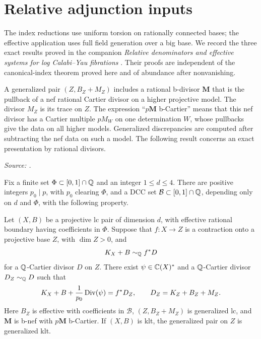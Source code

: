 \section{Relative adjunction inputs}\label{sec:relative-inputs}

The index reductions use uniform torsion on rationally connected bases;
the effective application uses full field generation over a big base.
We record the three exact results proved in the companion
\emph{Relative denominators and effective systems for log Calabi--Yau
fibrations} \cite{OpenAIRelative}. Their proofs are independent of the
canonical-index theorem proved here and of abundance after nonvanishing.

A generalized pair $(Z,B_Z+M_Z)$ includes a rational b-divisor
$\mathbf M$ that is the pullback of a nef rational Cartier divisor
on a higher projective model. The divisor $M_Z$ is its trace on $Z$.
The expression ``$p\mathbf M$ b-Cartier'' means that this nef divisor
has a Cartier multiple $pM_W$ on one determination $W$, whose
pullbacks give the data on all higher models. Generalized discrepancies
are computed after subtracting the nef data on such a model. The
following result concerns an exact presentation by rational divisors.

\noindent\textit{Source: \cite[Theorem~\RDenominatorNumber]{OpenAIRelative}.}
\begin{theorem}
\label{thm:relative-denominators}
Fix a finite set $\Phi\subset[0,1]\cap\mathbb Q$ and an integer $1\leq d\leq4$.
There are positive integers $p_0\mid p$, with $p_0$ clearing $\Phi$, and a
DCC set $\mathcal B\subset[0,1]\cap\mathbb Q$, depending only on $d$ and $\Phi$,
with the following property.

Let $(X,B)$ be a projective lc pair of dimension $d$, with effective rational
boundary having coefficients in $\Phi$.  Suppose that $f:X\to Z$ is a
contraction onto a projective base $Z$, with $\dim Z>0$, and
\[
 K_X+B\sim_\mathbb Q f^*D
\]
for a $\mathbb Q$-Cartier divisor $D$ on $Z$.  There exist
$\psi\in\mathbb C(X)^*$ and a $\mathbb Q$-Cartier divisor $D_Z\sim_\mathbb Q D$ such that
\begin{equation}\label{eq:relative-exact-presentation}
 K_X+B+\frac1{p_0}\operatorname{Div}(\psi)=f^*D_Z,
 \qquad D_Z=K_Z+B_Z+M_Z.
\end{equation}
Here $B_Z$ is effective with coefficients in $\mathcal B$,
$(Z,B_Z+M_Z)$ is generalized lc, and $\mathbf M$ is b-nef with
$p\mathbf M$ b-Cartier.  If $(X,B)$ is klt, the generalized pair on $Z$ is
generalized klt.
\end{theorem}

